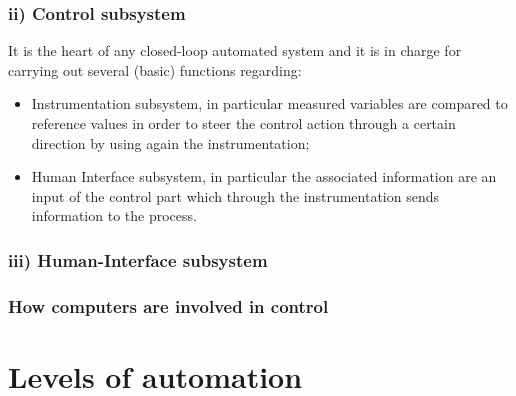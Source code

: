 \subsubsection{ii) Control subsystem}
It is the heart of any closed-loop automated system and it is in charge for carrying out several (basic) functions regarding: 
\begin{itemize}
    \itemsep-0.3em
    \item \textsf{Instrumentation subsystem}, in particular measured variables are compared to reference values in order to steer the control action through a certain direction by using again the instrumentation; 
    \item \textsf{Human Interface subsystem}, in particular the associated information are an input of the control part which through the instrumentation sends information to the process.
\end{itemize}


\subsubsection{iii) Human-Interface subsystem}

\subsubsection{How computers are involved in control}


\section{Levels of automation}